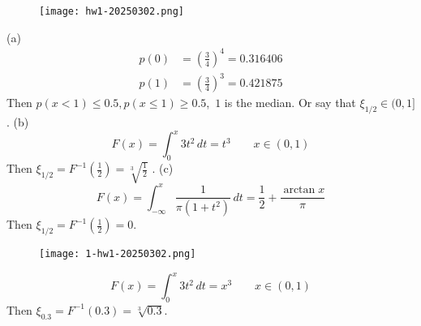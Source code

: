 \begin{figure}[H]
\centering
\texttt{[image: hw1-20250302.png]}
\label{}
\end{figure}
(a)
\[
\begin{aligned}
p(0) & =\left( \frac{3}{4} \right)^{4}=0.316406 \\
p(1) & =\left( \frac{3}{4} \right)^{3}=0.421875
\end{aligned}
\]
Then $p(x<1)\leq0.5,p(x\leq1)\geq0.5$, $\,1$ is the median. Or say that $\xi_{1/2 }\in(0,1]$.
(b)
\[
F(x)=\int_{0}^{x} 3t^{2} \, dt =t^{3}\qquad x\in(0,1)
\]
Then $\xi_{1/2 }=F^{-1}\left( \frac{1}{2} \right)=\sqrt[3]{ \frac{1}{2} }$ .
(c)
\[
F(x)=\int_{-\infty}^{x} \frac{1}{\pi(1+t^{2})}  \, dt =\frac{1}{2}+\frac{\arctan x}{\pi}
\]
Then $\xi_{1/2 }=F^{-1}\left( \frac{1}{2} \right)=0$.

\begin{figure}[H]
\centering
\texttt{[image: 1-hw1-20250302.png]}
\label{}
\end{figure}
\[
F(x)=\int_{0}^{x} 3t^{2} \, dt =x^{3}\qquad x\in(0,1)
\]
Then $\xi_{0.3}=F^{-1}(0.3)=\sqrt[3]{ 0.3 }$.

